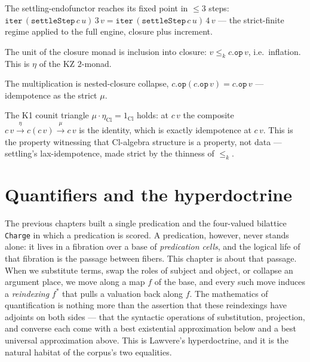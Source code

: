 \begin{theorem}\label{thm:settle-step-settles}\leanok{}
The settling-endofunctor reaches its fixed point in $\le 3$ steps:
$\texttt{iter}\,(\texttt{settleStep}\,c\,u)\,3\,v =
\texttt{iter}\,(\texttt{settleStep}\,c\,u)\,4\,v$ --- the strict-finite regime
applied to the full engine, closure plus increment.
\end{theorem}

\begin{theorem}\label{thm:kz-unit}\leanok{}
The unit of the closure monad is inclusion into closure: $v \le_k c.\texttt{op}\,v$,
i.e.\ inflation. This is $\eta$ of the KZ $2$-monad.
\end{theorem}

\begin{theorem}\label{thm:kz-mult}\leanok{}
The multiplication is nested-closure collapse, $c.\texttt{op}(c.\texttt{op}\,v) =
c.\texttt{op}\,v$ --- idempotence as the strict $\mu$.
\end{theorem}

\begin{theorem}\label{thm:counit-triangle}\leanok{}
The K1 counit triangle $\mu \cdot \eta_{\mathrm{Cl}} = 1_{\mathrm{Cl}}$ holds: at
$c\,v$ the composite $c\,v \xrightarrow{\eta} c(c\,v) \xrightarrow{\mu} c\,v$ is
the identity, which is exactly idempotence at $c\,v$. This is the property
witnessing that $\mathrm{Cl}$-algebra structure is a property, not data ---
settling's lax-idempotence, made strict by the thinness of $\le_k$.
\end{theorem}

\chapter{Quantifiers and the hyperdoctrine}\label{ch:hyperdoctrine}\label{def:hyperdoctrine}

The previous chapters built a single predication and the four-valued bilattice
\texttt{Charge} in which a predication is scored. A predication, however, never
stands alone: it lives in a fibration over a base of \emph{predication cells},
and the logical life of that fibration is the passage between fibers. This
chapter is about that passage. When we substitute terms, swap the roles of
subject and object, or collapse an argument place, we move along a map $f$ of the
base, and every such move induces a \emph{reindexing} $f^{*}$ that pulls a
valuation back along $f$. The mathematics of quantification is nothing more than
the assertion that these reindexings have adjoints on both sides --- that the
syntactic operations of substitution, projection, and converse each come with a
best existential approximation below and a best universal approximation above.
This is Lawvere's hyperdoctrine, and it is the natural habitat of the corpus's
two equalities.

